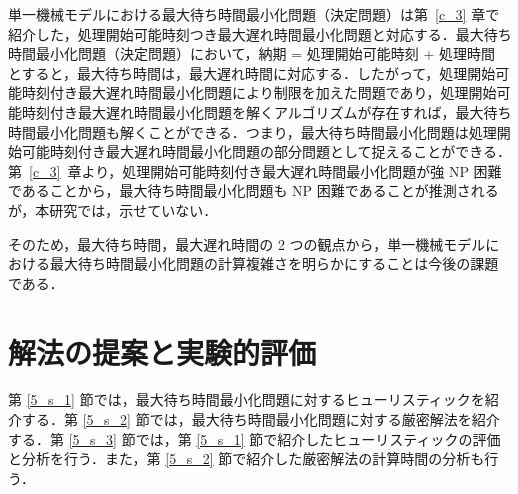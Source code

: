 \documentclass[12pt]{optlab-bachelor}
\begin{document}
単一機械モデルにおける最大待ち時間最小化問題（決定問題）は第~\ref{c_3} 章で紹介した，処理開始可能時刻つき最大遅れ時間最小化問題と対応する．最大待ち時間最小化問題（決定問題）において，納期 = 処理開始可能時刻 + 処理時間 とすると，最大待ち時間は，最大遅れ時間に対応する．したがって，処理開始可能時刻付き最大遅れ時間最小化問題により制限を加えた問題であり，処理開始可能時刻付き最大遅れ時間最小化問題を解くアルゴリズムが存在すれば，最大待ち時間最小化問題も解くことができる．つまり，最大待ち時間最小化問題は処理開始可能時刻付き最大遅れ時間最小化問題の部分問題として捉えることができる．第~\ref{c_3}~章より，処理開始可能時刻付き最大遅れ時間最小化問題が強 NP 困難であることから，最大待ち時間最小化問題も NP 困難であることが推測されるが，本研究では，示せていない．

そのため，最大待ち時間，最大遅れ時間の 2 つの観点から，単一機械モデルにおける最大待ち時間最小化問題の計算複雑さを明らかにすることは今後の課題である．

\chapter{解法の提案と実験的評価}\label{c_5}
第 \ref{5_s_1} 節では，最大待ち時間最小化問題に対するヒューリスティックを紹介する．第 \ref{5_s_2} 節では，最大待ち時間最小化問題に対する厳密解法を紹介する．第 \ref{5_s_3} 節では，第 \ref{5_s_1} 節で紹介したヒューリスティックの評価と分析を行う．また，第 \ref{5_s_2} 節で紹介した厳密解法の計算時間の分析も行う．
\end{document}
